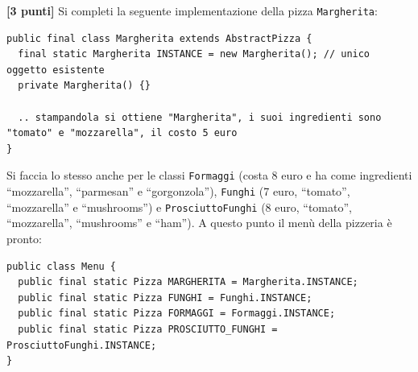 \documentclass{article}[10pt]
\newcounter{esnu}
\newenvironment{esercizio}{\medskip \noindent {\bf Esercizio\addtocounter{esnu}{1} \arabic{esnu}}}{}
\begin{document}
\begin{esercizio}
\textbf{[3 punti]}
Si completi la seguente implementazione della pizza \texttt{Margherita}:

{\small\begin{verbatim}
public final class Margherita extends AbstractPizza {
  final static Margherita INSTANCE = new Margherita(); // unico oggetto esistente
  private Margherita() {}

  .. stampandola si ottiene "Margherita", i suoi ingredienti sono "tomato" e "mozzarella", il costo 5 euro
}
\end{verbatim}}

\noindent
Si faccia lo stesso anche per le classi \texttt{Formaggi} (costa 8 euro
e ha come ingredienti ``mozzarella'', ``parmesan'' e ``gorgonzola''),
\texttt{Funghi} (7 euro, ``tomato'',
``mozzarella'' e ``mushrooms'') e \texttt{ProsciuttoFunghi}
(8 euro, ``tomato'', ``mozzarella'',
``mushrooms'' e ``ham''). A questo punto il men\`u della pizzeria \`e pronto:
%
{\small\begin{verbatim}
public class Menu {
  public final static Pizza MARGHERITA = Margherita.INSTANCE;
  public final static Pizza FUNGHI = Funghi.INSTANCE;
  public final static Pizza FORMAGGI = Formaggi.INSTANCE;
  public final static Pizza PROSCIUTTO_FUNGHI = ProsciuttoFunghi.INSTANCE;
}
\end{verbatim}}
%
\end{esercizio}
\end{document}
